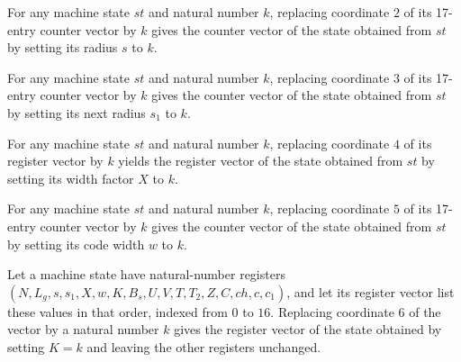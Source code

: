 \begin{lemma}
\label{Complexity.LogProg.ExpBFS.St.upd_s}
\leanok
{}
For any machine state $st$ and natural number $k$, replacing coordinate $2$ of its
17-entry counter vector by $k$ gives the counter vector of the state obtained from $st$
by setting its radius $s$ to $k$.
\end{lemma}

\begin{lemma}
\label{Complexity.LogProg.ExpBFS.St.upd_s1}
\leanok
{}
For any machine state $st$ and natural number $k$, replacing coordinate $3$ of its
17-entry counter vector by $k$ gives the counter vector of the state obtained from $st$
by setting its next radius $s_1$ to $k$.
\end{lemma}

\begin{lemma}
\label{Complexity.LogProg.ExpBFS.St.upd_X}
\leanok
{}
For any machine state $st$ and natural number $k$, replacing coordinate $4$ of its
register vector by $k$ yields the register vector of the state obtained from $st$ by
setting its width factor $X$ to $k$.
\end{lemma}

\begin{lemma}
\label{Complexity.LogProg.ExpBFS.St.upd_w}
\leanok
{}
For any machine state $st$ and natural number $k$, replacing coordinate $5$ of its
17-entry counter vector by $k$ gives the counter vector of the state obtained from $st$
by setting its code width $w$ to $k$.
\end{lemma}

\begin{lemma}
\label{Complexity.LogProg.ExpBFS.St.upd_K}
\leanok
{}
Let a machine state have natural-number registers
$(N,L_g,s,s_1,X,w,K,B_s,U,V,T,T_2,Z,C,ch,c,c_1)$, and let its register vector list these
values in that order, indexed from $0$ to $16$. Replacing coordinate $6$ of the vector
by a natural number $k$ gives the register vector of the state obtained by setting $K=k$
and leaving the other registers unchanged.
\end{lemma}

